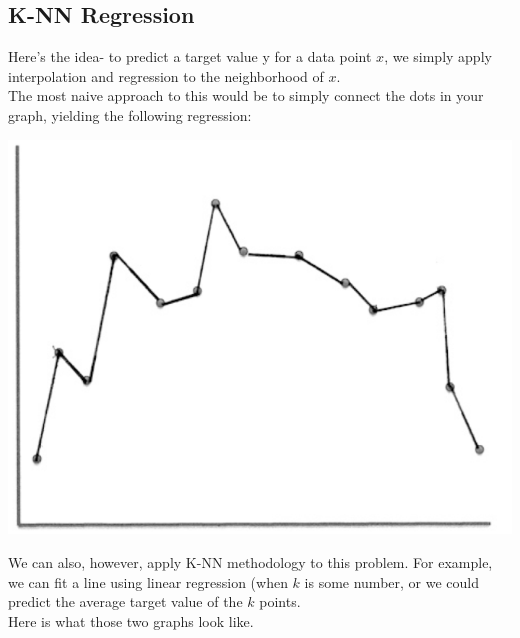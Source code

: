 \documentclass[english, 10pt]{article}
\begin{document}
\subsection{K-NN Regression}

Here's the idea- to predict a target value y for a data point $x$, we simply apply interpolation and regression to the neighborhood of $x$.\\

The most naive approach to this would be to simply connect the dots in your graph, yielding the following regression:\\

{
\centering

\includegraphics[scale=0.2]{img/connect.png}

}

\hfill \break We can also, however, apply K-NN methodology to this problem. For example, we can fit a line using linear regression (when $k$ is some number, or we could predict the average target value of the $k$ points.\\

Here is what those two graphs look like.\\
\end{document}
